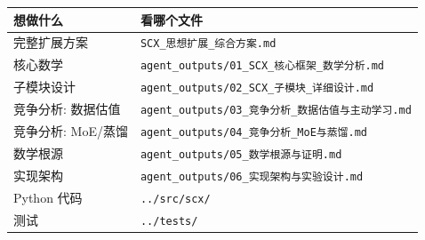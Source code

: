 \documentclass[
  12pt,
]{ctexart}
\begin{document}
\begin{longtable}[]{@{}
  >{\raggedright\arraybackslash}p{}
  >{\raggedright\arraybackslash}p{}@{}}
\toprule\noalign{}
\begin{minipage}[b]{\linewidth}\raggedright
想做什么
\end{minipage} & \begin{minipage}[b]{\linewidth}\raggedright
看哪个文件
\end{minipage} \\
\midrule\noalign{}
\endhead
\bottomrule\noalign{}
\endlastfoot
完整扩展方案 & \texttt{SCX\_思想扩展\_综合方案.md} \\
核心数学 & \texttt{agent\_outputs/01\_SCX\_核心框架\_数学分析.md} \\
子模块设计 & \texttt{agent\_outputs/02\_SCX\_子模块\_详细设计.md} \\
竞争分析: 数据估值 &
\texttt{agent\_outputs/03\_竞争分析\_数据估值与主动学习.md} \\
竞争分析: MoE/蒸馏 &
\texttt{agent\_outputs/04\_竞争分析\_MoE与蒸馏.md} \\
数学根源 & \texttt{agent\_outputs/05\_数学根源与证明.md} \\
实现架构 & \texttt{agent\_outputs/06\_实现架构与实验设计.md} \\
Python 代码 & \texttt{../src/scx/} \\
测试 & \texttt{../tests/} \\
\end{longtable}
\end{document}
